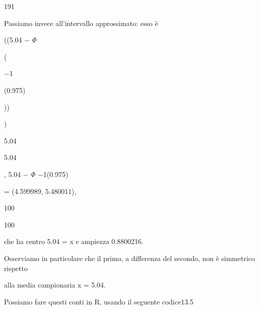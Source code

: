 \documentclass[a4paper,portrait,12pt]{article}
\begin{document}
191





\begin{flushleft}
Passiamo invece all'intervallo approssimato: esso \`{e}
\end{flushleft}





\begin{flushleft}
((5.04 $-$ $\Phi$
\end{flushleft}


(





$-$1





(0.975)





))


)





5.04


5.04


\begin{flushleft}
, 5.04 $-$ $\Phi$ $-$1(0.975)
\end{flushleft}


= (4.599989, 5.480011),


100


100





\begin{flushleft}
che ha centro 5.04 = x e ampiezza 0.8800216.
\end{flushleft}


\begin{flushleft}
Osserviamo in particolare che il primo, a differenza del secondo, non \`{e} simmetrico rispetto
\end{flushleft}


\begin{flushleft}
alla media campionaria x = 5.04.
\end{flushleft}


\begin{flushleft}
Possiamo fare questi conti in R, usando il seguente codice13.5
\end{flushleft}
\end{document}
